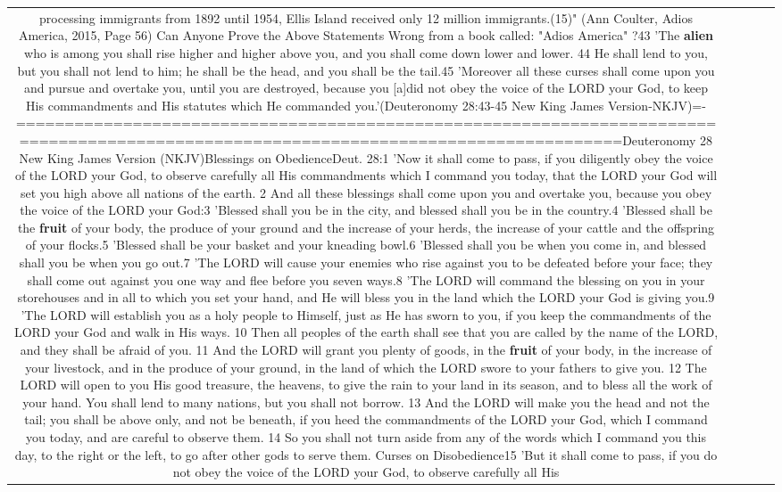 \documentclass[11pt]{article}
\newlength\mylength
\begin{document}
\begin{center}
\begin{longtable}{|C{.65\mylength}|C{.30\mylength}|C{.12\mylength}|C{.12\mylength}|C{.12\mylength}|}
processing immigrants from 1892 until 1954, Ellis Island  received only 12 million immigrants.(15)"  (Ann Coulter, Adios America, 2015, Page 56)  Can Anyone Prove  the Above Statements  Wrong from a  book called:  "Adios  America" ?43 'The \textbf{alien} who is among you shall rise higher and higher above you, and you shall come down lower and lower. 44 He shall lend to you, but you shall not lend to him; he shall be the head, and you shall be the tail.45 'Moreover all these curses shall come upon you and pursue and overtake you, until you are destroyed, because you [a]did not obey the voice of the LORD your God, to keep His commandments and His statutes which He commanded you.'(Deuteronomy 28:43-45 New King James Version-NKJV)=-======================================================================================================================================Deuteronomy 28 New King James Version (NKJV)Blessings on ObedienceDeut. 28:1 'Now it shall come to pass, if you diligently obey the voice of the LORD your God, to observe carefully all His commandments which I command you today, that the LORD your God will set you high above all nations of the earth. 2 And all these blessings shall come upon you and overtake you, because you obey the voice of the LORD your God:3 'Blessed shall you be in the city, and blessed shall you be in the country.4 'Blessed shall be the \textbf{fruit} of your body, the produce of your ground and the increase of your herds, the increase of your cattle and the offspring of your flocks.5 'Blessed shall be your basket and your kneading bowl.6 'Blessed shall you be when you come in, and blessed shall you be when you go out.7 'The LORD will cause your enemies who rise against you to be defeated before your face; they shall come out against you one way and flee before you seven ways.8 'The LORD will command the blessing on you in your storehouses and in all to which you set your hand, and He will bless you in the land which the LORD your God is giving you.9 'The LORD will establish you as a holy people to Himself, just as He has sworn to you, if you keep the commandments of the LORD your God and walk in His ways. 10 Then all peoples of the earth shall see that you are called by the name of the LORD, and they shall be afraid of you. 11 And the LORD will grant you plenty of goods, in the \textbf{fruit} of your body, in the increase of your livestock, and in the produce of your ground, in the land of which the LORD swore to your fathers to give you. 12 The LORD will open to you His good treasure, the heavens, to give the rain to your land in its season, and to bless all the work of your hand. You shall lend to many nations, but you shall not borrow. 13 And the LORD will make you the head and not the tail; you shall be above only, and not be beneath, if you heed the commandments of the LORD your God, which I command you today, and are careful to observe them. 14 So you shall not turn aside from any of the words which I command you this day, to the right or the left, to go after other gods to serve them.  Curses on Disobedience15 'But it shall come to pass, if you do not obey the voice of the LORD your God, to observe carefully all His 
\end{longtable}
\end{center}
\end{document}
